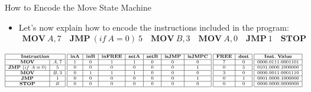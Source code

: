 \begin{frame}[allowframebreaks]{How to Encode the Move State Machine}
\begin{itemize}
\item Let's now explain how to encode the instructions included in the program:
\begin{align*}
\mathbf{MOV}~A, 7 \quad \mathbf{JMP}~(if~A = 0)~5 \quad \mathbf{MOV}~B,3 \quad \mathbf{MOV}~A,0 \quad \mathbf{JMP}~1 \quad \mathbf{STOP}
\end{align*}
\end{itemize}
\[
\scriptsize
\begin{array}{|c|c|}
\hline
\multicolumn{2}{|c|}{\mathbf{Instruction}} \\ \hline
\mathbf{MOV} & A, 7 \\ \hline
\mathbf{JMP}~(if~A = 0) & 5 \\ \hline
\mathbf{MOV} & B,3 \\ \hline
\mathbf{JMP} & 1 \\ \hline
\mathbf{STOP} & \emptyset \\ \hline
\end{array}
\hspace{0.1cm}
\begin{array}{|c|c|c|c|c|c|c|c|}
\hline
\textbf{inA} & \textbf{inB} & \textbf{inFREE} & \textbf{setA} & \textbf{setB} & \textbf{isJMP} & \textbf{isJMPC} \\ \hline
1 & 0 & 1 & 1 & 0 & 0 & 0 \\ \hline
0 & 0 & 0 & 0 & 0 & 0 & 1 \\ \hline
0 & 1 & 1 & 1 & 0 & 0 & 0 \\ \hline
0 & 0 & 0 & 0 & 0 & 0 & 1  \\ \hline
0 & 0 & 0 & 0 & 0 & 0 & 0 \\ \hline
\end{array}
\hspace{0.1cm}
\begin{array}{|c|c|}
\hline
\mathbf{FREE} & \mathbf{dest} \\ \hline
7 & 0 \\ \hline
0 & 5 \\ \hline
3 & 0 \\ \hline
0 & 1 \\ \hline
0 & 0 \\ \hline
\end{array}
\hspace{0.1cm}
\begin{array}{|c|}
\hline
\mathbf{Inst.~Value} \\ \hline
0000.0111.0001101 \\ \hline
0101.0000.1000000 \\ \hline
0000.0011.0001110 \\ \hline
0001.0000.1000000 \\ \hline
0000.0000.0000000 \\ \hline
\end{array}
\]


\end{frame}
